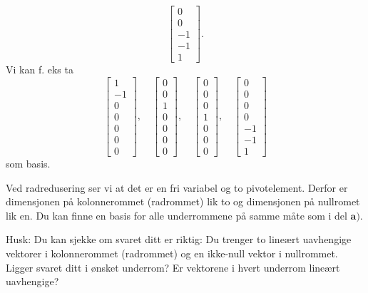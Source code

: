 \begin{losning}
\begin{punkt}
$$\begin{bmatrix}
0\\
0\\
-1\\
-1\\
1
\end{bmatrix}.$$ Vi kan f. eks ta $$\begin{bmatrix}
1\\
-1\\
0\\
0\\
0\\
0\\
0
\end{bmatrix},\quad \begin{bmatrix}
0\\
0\\
1\\
0\\
0\\
0\\
0
\end{bmatrix}, \quad \begin{bmatrix}
0\\
0\\
0\\
1\\
0\\
0\\
0
\end{bmatrix}, \quad \begin{bmatrix}
0\\
0\\
0\\
0\\
-1\\
-1\\
1
\end{bmatrix}$$ som basis.
\end{punkt}

\begin{punkt}

Ved radredusering ser vi at det er en fri variabel og to pivotelement. Derfor er dimensjonen på kolonnerommet (radrommet) lik to og dimensjonen på nullromet lik en. Du kan finne en basis for alle underrommene på samme måte som i del $\textbf{a)}$.

\noindent
Husk: Du kan sjekke om svaret ditt er riktig: Du trenger to lineært uavhengige vektorer i kolonnerommet (radrommet) og en ikke-null vektor i nullrommet. Ligger svaret ditt i ønsket underrom? Er vektorene i hvert underrom lineært uavhengige?
\end{punkt}


\end{losning}
